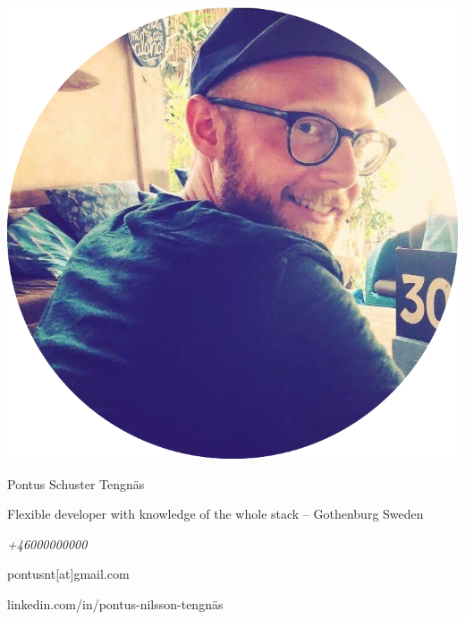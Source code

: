 \begin{minipage}{0.4\textwidth}
  \includegraphics[width=\linewidth]{../img/me.png}
\end{minipage}
\hspace{1.0cm}\begin{minipage}{0.5\textwidth}
  {\Large Pontus Schuster Tengnäs}

  Flexible developer with knowledge of the whole stack – Gothenburg Sweden
  \newline
  \newline
  {\itshape
  +46000000000

  pontusnt[at]gmail.com

  linkedin.com/in/pontus-nilsson-tengnäs}

\end{minipage}
